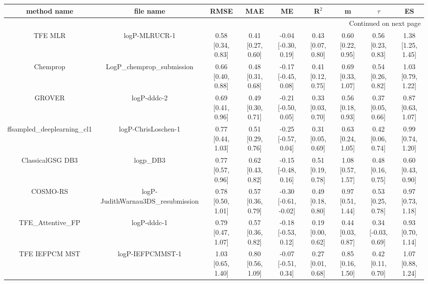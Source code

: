 \documentclass{article}
\begin{document}
\begin{center}
\scriptsize
\begin{longtable}{|ccccccccc|}
\toprule
                method name &                                   file name &               RMSE &                MAE &                    ME &              R$^2$ &                     m &                $\tau$ &                    ES \\
\midrule
\endhead
\midrule
\multicolumn{9}{r}{{Continued on next page}} \\
\midrule
\endfoot

\bottomrule
\endlastfoot
                    TFE MLR &                               logP-MLRUCR-1 &  0.58 [0.34, 0.83] &  0.41 [0.27, 0.60] &   -0.04 [-0.30, 0.19] &  0.43 [0.07, 0.80] &     0.60 [0.22, 0.95] &     0.56 [0.23, 0.83] &     1.38 [1.25, 1.45] \\
                   Chemprop &                  LogP\_chemprop\_submission &  0.66 [0.40, 0.88] &  0.48 [0.31, 0.68] &   -0.17 [-0.45, 0.08] &  0.41 [0.12, 0.75] &     0.69 [0.33, 1.07] &     0.54 [0.26, 0.82] &     1.03 [0.79, 1.22] \\
                     GROVER &                                 logP-dddc-2 &  0.69 [0.41, 0.96] &  0.49 [0.30, 0.71] &   -0.21 [-0.50, 0.05] &  0.33 [0.03, 0.70] &     0.56 [0.18, 0.93] &     0.37 [0.05, 0.66] &     0.87 [0.63, 1.07] \\
 ffsampled_deeplearning_cl1 &                         logP-ChrisLoschen-1 &  0.77 [0.44, 1.03] &  0.51 [0.29, 0.76] &   -0.25 [-0.57, 0.04] &  0.31 [0.05, 0.69] &     0.63 [0.24, 1.05] &     0.42 [0.06, 0.74] &     0.99 [0.74, 1.20] \\
           ClassicalGSG DB3 &                                   logp\_DB3 &  0.77 [0.57, 0.96] &  0.62 [0.43, 0.82] &   -0.15 [-0.48, 0.16] &  0.51 [0.19, 0.78] &     1.08 [0.57, 1.57] &     0.48 [0.16, 0.75] &     0.60 [0.43, 0.90] \\
                   COSMO-RS &          logP-JudithWarnau3DS\_resubmission &  0.78 [0.50, 1.01] &  0.57 [0.36, 0.79] &  -0.30 [-0.61, -0.02] &  0.49 [0.18, 0.80] &     0.97 [0.51, 1.44] &     0.53 [0.25, 0.78] &     0.97 [0.73, 1.18] \\
           TFE_Attentive_FP &                                 logP-dddc-1 &  0.79 [0.47, 1.07] &  0.57 [0.36, 0.82] &   -0.18 [-0.53, 0.12] &  0.19 [0.00, 0.62] &     0.44 [0.03, 0.87] &    0.34 [-0.03, 0.69] &     0.93 [0.70, 1.14] \\
             TFE IEFPCM MST &                            logP-IEFPCMMST-1 &  1.03 [0.65, 1.40] &  0.80 [0.56, 1.09] &   -0.07 [-0.51, 0.34] &  0.27 [0.01, 0.68] &     0.85 [0.16, 1.50] &     0.42 [0.11, 0.70] &     1.07 [0.88, 1.24] \\

\end{longtable}
\end{center}
\end{document}

